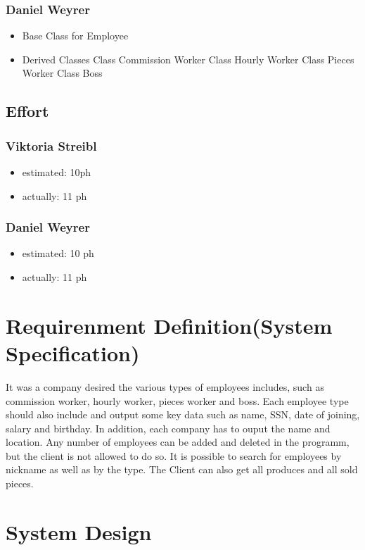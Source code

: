 \subsubsection{Daniel Weyrer}
\begin{itemize}
	\item Base Class for Employee
	\item Derived Classes
		\subitem Class Commission Worker
		\subitem Class Hourly Worker
		\subitem Class Pieces Worker
		\subitem Class Boss
\end{itemize}

\subsection{Effort}

\subsubsection {Viktoria Streibl}
\begin{itemize}
	\item estimated: 10ph 
	\item actually: 11 ph
\end{itemize}

\subsubsection {Daniel Weyrer}
\begin{itemize}
	\item estimated: 10 ph 
	\item actually: 11 ph
\end{itemize}

\section{Requirenment Definition(System Specification)}
It was a company desired the various types of employees includes, such as commission worker, hourly worker, pieces worker and boss. Each employee type should also include and output some key data such as name, SSN, date of joining, salary and birthday. In addition, each company has to ouput the name and location.
Any number of employees can be added and deleted in the programm, but the client is not allowed to do so. It is possible to search for employees by nickname as well as by the type. The Client can also get all produces and all sold pieces.

\section{System Design}
